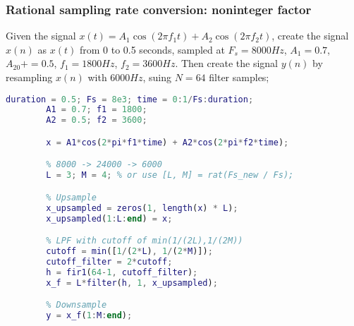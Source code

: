     \subsubsection{Rational sampling rate conversion: noninteger factor}
    Given the signal $x(t)=A_1\cos(2\pi f_1t)+A_2\cos(2\pi f_2t)$, create the signal $x(n)$ as $x(t)$ from 0 to 0.5 seconds, sampled at $F_s=8000Hz$, $A_1=0.7$, $A_20+=0.5$, $f_1=1800Hz$, $f_2=3600Hz$. Then create the signal $y(n)$ by resampling $x(n)$ with $6000Hz$, suing $N=64$ filter samples;
    \begin{lstlisting}[language=Matlab, escapeinside=`']
        duration = 0.5; Fs = 8e3; time = 0:1/Fs:duration;
        A1 = 0.7; f1 = 1800;
        A2 = 0.5; f2 = 3600;

        x = A1*cos(2*pi*f1*time) + A2*cos(2*pi*f2*time);

        % 8000 -> 24000 -> 6000
        L = 3; M = 4; % or use [L, M] = rat(Fs_new / Fs); 

        % Upsample
        x_upsampled = zeros(1, length(x) * L);
        x_upsampled(1:L:end) = x;

        % LPF with cutoff of min(1/(2L),1/(2M))
        cutoff = min([1/(2*L), 1/(2*M)]);
        cutoff_filter = 2*cutoff;
        h = fir1(64-1, cutoff_filter);
        x_f = L*filter(h, 1, x_upsampled);

        % Downsample
        y = x_f(1:M:end);
    \end{lstlisting}

